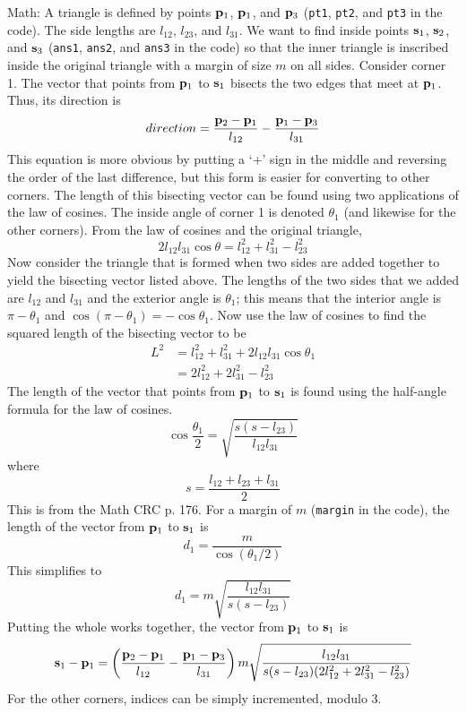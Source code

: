 \documentclass[11pt]{article}
\newcommand {\ttt} {\texttt}
\begin{document}
\begin{description}
Math: A triangle is defined by points $\vb{p}_1$, $\vb{p}_1$, and $\vb{p}_3$ (\ttt{pt1}, \ttt{pt2}, and \ttt{pt3} in the code). The side lengths are $l_{12}$, $l_{23}$, and $l_{31}$. We want to find inside points $\vb{s}_1$, $\vb{s}_2$, and $\vb{s}_3$ (\ttt{ans1}, \ttt{ans2}, and \ttt{ans3} in the code) so that the inner triangle is inscribed inside the original triangle with a margin of size $m$ on all sides. Consider corner 1. The vector that points from $\vb{p}_1$ to $\vb{s}_1$ bisects the two edges that meet at $\vb{p}_1$. Thus, its direction is
$$direction = \frac{\vb{p}_2 - \vb{p}_1}{l_{12}} - \frac{\vb{p}_1 - \vb{p}_3}{l_{31}}$$
This equation is more obvious by putting a `+' sign in the middle and reversing the order of the last difference, but this form is easier for converting to other corners. The length of this bisecting vector can be found using two applications of the law of cosines. The inside angle of corner 1 is denoted $\theta_1$ (and likewise for the other corners). From the law of cosines and the original triangle,
$$2l_{12}l_{31} \cos \theta = l_{12}^2 + l_{31}^2 - l_{23}^2$$
Now consider the triangle that is formed when two sides are added together to yield the bisecting vector listed above. The lengths of the two sides that we added are $l_{12}$ and $l_{31}$ and the exterior angle is $\theta_1$; this means that the interior angle is $\pi-\theta_1$ and $\cos(\pi-\theta_1) = -\cos \theta_1$. Now use the law of cosines to find the squared length of the bisecting vector to be
\begin{align*}
L^2 &= l_{12}^2 + l_{31}^2 + 2l_{12}l_{31} \cos \theta_1\\
&= 2 l_{12}^2 + 2 l_{31}^2 - l_{23}^2
\end{align*}
The length of the vector that points from $\vb{p}_1$ to $\vb{s}_1$ is found using the half-angle formula for the law of cosines.
$$\cos \frac{\theta_1}{2} = \sqrt{\frac{s(s-l_{23})}{l_{12}l_{31}}}$$
where
$$s = \frac{l_{12} + l_{23} + l_{31}}{2}$$
This is from the Math CRC p. 176. For a margin of $m$ (\ttt{margin} in the code), the length of the vector from $\vb{p}_1$ to $\vb{s}_1$ is
$$d_1 = \frac{m}{\cos (\theta_1/2)}$$
This simplifies to
$$d_1 = m \sqrt{\frac{l_{12}l_{31}}{s(s-l_{23})}}$$
Putting the whole works together, the vector from $\vb{p}_1$ to $\vb{s}_1$ is
$$\vb{s}_1 - \vb{p}_1 = \left( \frac{\vb{p}_2 - \vb{p}_1}{l_{12}} - \frac{\vb{p}_1 - \vb{p}_3}{l_{31}} \right) m \sqrt{\frac{l_{12}l_{31}}{s(s-l_{23})(2l_{12}^2+2l_{31}^2-l_{23}^2)}}$$
For the other corners, indices can be simply incremented, modulo 3.


\end{description}
\end{document}
